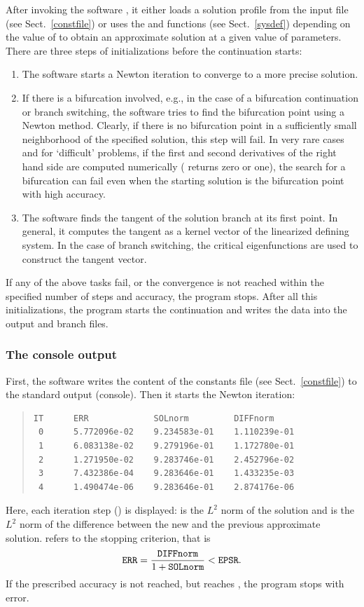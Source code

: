 \documentclass[10pt,a4paper]{ddedoc}
\begin{document}
After invoking the software , it either loads a solution profile
from the input file (see Sect.\ \ref{constfile}) or uses the 
 and  functions (see Sect.\ \ref{sysdef})
depending on the value of  to obtain an approximate solution at a
given value of parameters. There are three steps of initializations before the
continuation starts:
\begin{enumerate}
\item The software starts a Newton iteration to converge to a more precise
solution.
\item If there is a bifurcation involved, e.g., in the case of a bifurcation
continuation or branch switching, the software tries to find the bifurcation
point using a Newton method. Clearly, if there is no bifurcation point in a
sufficiently small neighborhood of the specified solution, this step will fail.
In very rare cases and for `difficult' problems, if the first and second
derivatives of the right hand side are computed numerically (
returns zero or one), the search for a bifurcation can fail even when the
starting solution is the bifurcation point with high accuracy.
\item The software finds the tangent of the solution branch at its first point. In
general, it computes the tangent as a kernel vector of the linearized defining
system. In the case of branch switching, the critical eigenfunctions are used to
construct the tangent vector.
\end{enumerate}
If any of the above tasks fail, or the convergence is not reached within the
specified number of steps and accuracy, the program stops.
After all this initializations, the program starts the continuation and writes
the data into the output and branch files.

\subsubsection{The console output}

First, the software writes the content of the constants file (see Sect.\
\ref{constfile}) to the standard output (console). Then it starts the Newton
iteration:
{ \small \begin{quote} \begin{lstlisting}[basicstyle=\tt,frame=single]
IT      ERR             SOLnorm         DIFFnorm
 0      5.772096e-02    9.234583e-01    1.110239e-01
 1      6.083138e-02    9.279196e-01    1.172780e-01
 2      1.271950e-02    9.283746e-01    2.452796e-02
 3      7.432386e-04    9.283646e-01    1.433235e-03
 4      1.490474e-06    9.283646e-01    2.874176e-06
\end{lstlisting} \end{quote} } \noindent
Here, each iteration step () is displayed:  is the $L^2$
norm of the solution and \funp{DIFFnorm} is the $L^2$ norm of the difference
between the new and the previous approximate solution. \funp{ERR} refers to the
stopping criterion, that is
\[
	{\tt ERR} = \frac{{\tt DIFFnorm}}{1+{\tt SOLnorm}} < {\tt EPSR}.
\]
If the prescribed accuracy is not reached, but  reaches ,
the program stops with error.
\end{document}
